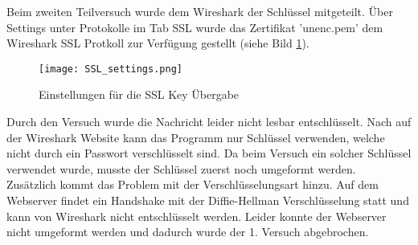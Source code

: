 	Beim zweiten Teilversuch wurde dem Wireshark der Schlüssel mitgeteilt. Über Settings unter Protokolle im Tab SSL wurde das Zertifikat 'unenc.pem' dem Wireshark SSL Protkoll zur Verfügung gestellt (siehe Bild \ref{fig:ssl_settings}).
	\begin{figure}[H]
		\centering
		\texttt{[image: SSL\_settings.png]}
		\caption{Einstellungen für die SSL Key Übergabe}
		\label{fig:ssl_settings}
	\end{figure}
	Durch den Versuch wurde die Nachricht leider nicht lesbar entschlüsselt. Nach  auf der Wireshark Website kann das Programm nur Schlüssel verwenden, welche nicht durch ein Passwort verschlüsselt sind. Da beim Versuch ein solcher Schlüssel verwendet wurde, musste der Schlüssel zuerst noch umgeformt werden.\\
	Zusätzlich kommt das Problem mit der Verschlüsselungsart hinzu. Auf dem Webserver findet ein Handshake mit der Diffie-Hellman Verschlüsselung statt und kann von Wireshark nicht entschlüsselt werden. Leider konnte der Webserver nicht umgeformt werden und dadurch wurde der 1. Versuch abgebrochen.\\
	
